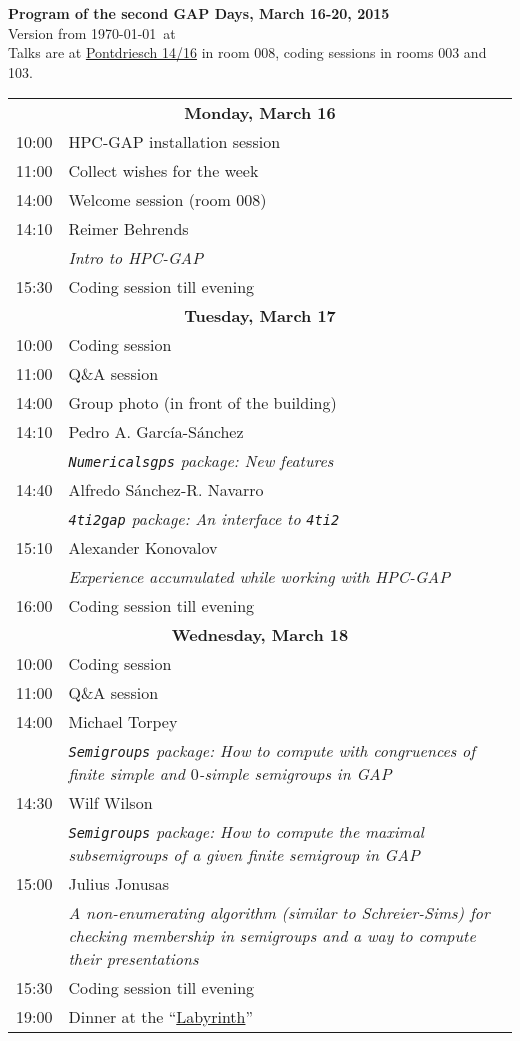 \documentclass[12pt,a4paper]{article}
\begin{document}
\begin{center}
{\huge\textbf{Program of the second GAP Days, March 16-20, 2015}\\[2mm]}
Version from \today\ at \currenttime\\[2mm]
Talks are at \href{https://maps.google.com/maps?q=Pontdriesch+14,+Aachen,+Germany&hl=en&ll=50.778617,6.080579&spn=0.004993,0.008969&sll=37.0625,-95.677068&sspn=50.777825,73.476563&oq=pontdriesch+14+&hnear=Pontdriesch+14,+Mitte+52062+Aachen,+Germany&t=m&z=17}{Pontdriesch 14/16}
in room 008, coding sessions in rooms 003 and 103.
\end{center}

\newcommand{\talk}[3]{#1 & #2 \\ & \textit{#3} \\}

\newcommand{\newday}[1]{\multicolumn{2}{c}{{\large\textbf{#1}}} \\[1em]}


\begin{tabular}{rp{14.5cm}}
%
\newday{Monday, March 16}
10:00 & HPC-GAP installation session \\
11:00 & Collect wishes for the week \\
14:00 & Welcome session (room 008) \\
\talk{14:10}{Reimer Behrends}{Intro to \textsf{HPC-GAP}}
15:30 & Coding session till evening

%
%
\\
%
%
\newday{Tuesday, March 17}
10:00 & Coding session \\
11:00 & Q\&A session \\
14:00 & Group photo (in front of the building) \\ 
\talk{14:10}{Pedro A. García-Sánchez}{\texttt{Numericalsgps} package: New features}
\talk{14:40}{Alfredo Sánchez-R. Navarro}{\texttt{4ti2gap} package: An interface to \texttt{4ti2}}
\talk{15:10}{Alexander Konovalov}{Experience accumulated while working with \textsf{HPC-GAP}}
16:00 & Coding session till evening

%
%
\\
%
%
\newday{Wednesday, March 18}
10:00 & Coding session \\
11:00 & Q\&A session \\
\talk{14:00}{Michael Torpey}{\texttt{Semigroups} package: How to compute with congruences of finite simple and $0$-simple semigroups in \textsf{GAP}}
\talk{14:30}{Wilf Wilson}{\texttt{Semigroups} package: How to compute the maximal subsemigroups of a given finite semigroup in \textsf{GAP}}
\talk{15:00}{Julius Jonusas}{A non-enumerating algorithm (similar to Schreier-Sims) for checking membership in semigroups and a way to compute their presentations}
15:30 & Coding session till evening \\
19:00 & Dinner at the ``\href{http://www.labyrinthaachen.de/}{Labyrinth}'' \\
\end{tabular}
\end{document}
